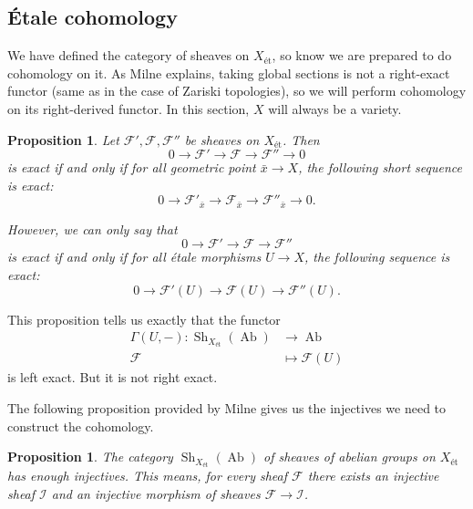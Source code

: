 \documentclass{report}
\DeclareMathOperator{\Sh}{Sh}
\DeclareMathOperator{\Ab}{Ab}
\newtheorem{proposition}[theorem]{Proposition}
\theoremstyle{definition}
\begin{document}
\subsection{\'{E}tale cohomology}

We have defined the category of sheaves on $X_{\text{\'{e}t}}$, so know we are prepared to do cohomology on it. As Milne \cite[Section~I.7]{milne2013lectures} explains, taking global sections is not a right-exact functor (same as in the case of Zariski topologies), so we will perform cohomology on its right-derived functor. In this section, $X$ will always be a variety.

\begin{proposition}
Let $\mathcal{F}',\mathcal{F},\mathcal{F}''$ be sheaves on $X_{\text{\'{e}t}}$. Then
\[0\longrightarrow\mathcal{F}'\longrightarrow\mathcal{F}\longrightarrow\mathcal{F}''\longrightarrow0\]
is exact if and only if for all geometric point $\bar{x}\rightarrow X$, the following short sequence is exact:
\[0\longrightarrow\mathcal{F}'_{\bar{x}}\longrightarrow\mathcal{F}_{\bar{x}}\longrightarrow\mathcal{F}''_{\bar{x}}\longrightarrow0.\]

However, we can only say that
\[0\longrightarrow\mathcal{F}'\longrightarrow\mathcal{F}\longrightarrow\mathcal{F}''\]
is exact if and only if for all \'{e}tale morphisms $U\rightarrow X$, the following sequence is exact:
\[0\longrightarrow\mathcal{F}'(U)\longrightarrow\mathcal{F}(U)\longrightarrow\mathcal{F}''(U).\]
\end{proposition}

This proposition tells us exactly that the functor
\begin{align*}
\Gamma(U,-):\Sh_{X_{\text{\'{e}t}}}(\Ab)&\longrightarrow\Ab\\
\mathcal{F}&\longmapsto\mathcal{F}(U)
\end{align*}
is left exact. But it is not right exact.

The following proposition provided by Milne \cite[Proposition~I.8.12]{milne2013lectures} gives us the injectives we need to construct the cohomology.

\begin{proposition}
The category $\Sh_{X_{\text{\'{e}t}}}(\Ab)$ of sheaves of abelian groups on $X_{\text{\'{e}t}}$ has enough injectives. This means, for every sheaf $\mathcal{F}$ there exists an injective sheaf $\mathcal{I}$ and an injective morphism of sheaves $\mathcal{F}\rightarrow\mathcal{I}$.
\end{proposition}
\end{document}
